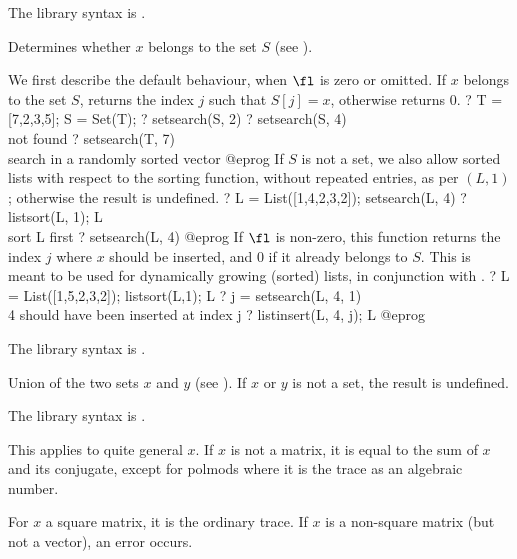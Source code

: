The library syntax is .

\label{se:setsearch}
Determines whether $x$ belongs to the set $S$ (see ).

We first describe the default behaviour, when $\fl$ is zero or omitted. If $x$
belongs to the set $S$, returns the index $j$ such that $S[j]=x$, otherwise
returns 0.
\bprog
? T = [7,2,3,5]; S = Set(T);
? setsearch(S, 2)
? setsearch(S, 4)      \\ not found
? setsearch(T, 7)      \\ search in a randomly sorted vector
@eprog\noindent
If $S$ is not a set, we also allow sorted lists with
respect to the  sorting function, without repeated entries,
as per $(L,1)$; otherwise the result is undefined.
\bprog
? L = List([1,4,2,3,2]); setsearch(L, 4)
? listsort(L, 1); L    \\ sort L first
? setsearch(L, 4)
@eprog\noindent
If $\fl$ is non-zero, this function returns the index $j$ where $x$ should be
inserted, and $0$ if it already belongs to $S$. This is meant to be used for
dynamically growing (sorted) lists, in conjunction with .
\bprog
? L = List([1,5,2,3,2]); listsort(L,1); L
? j = setsearch(L, 4, 1)  \\ 4 should have been inserted at index j
? listinsert(L, 4, j); L
@eprog

The library syntax is .

\label{se:setunion}
Union of the two sets $x$ and $y$ (see ).
If $x$ or $y$ is not a set, the result is undefined.

The library syntax is .

\label{se:trace}
This applies to quite general $x$. If $x$ is not a
matrix, it is equal to the sum of $x$ and its conjugate, except for polmods
where it is the trace as an algebraic number.

For $x$ a square matrix, it is the ordinary trace. If $x$ is a
non-square matrix (but not a vector), an error occurs.

